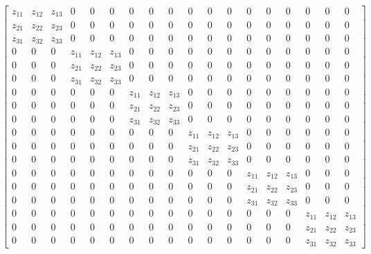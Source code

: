 \newpage
\begin{equation*}
\left[\begin{array}{cccccccccccccccccc}z_{11} & z_{12} & z_{13} & 0 & 0 & 0 & 0 & 0 & 0 & 0 & 0 & 0 & 0 & 0 & 0 & 0 & 0 & 0\\z_{21} & z_{22} & z_{23} & 0 & 0 & 0 & 0 & 0 & 0 & 0 & 0 & 0 & 0 & 0 & 0 & 0 & 0 & 0\\z_{31} & z_{32} & z_{33} & 0 & 0 & 0 & 0 & 0 & 0 & 0 & 0 & 0 & 0 & 0 & 0 & 0 & 0 & 0\\0 & 0 & 0 & z_{11} & z_{12} & z_{13} & 0 & 0 & 0 & 0 & 0 & 0 & 0 & 0 & 0 & 0 & 0 & 0\\0 & 0 & 0 & z_{21} & z_{22} & z_{23} & 0 & 0 & 0 & 0 & 0 & 0 & 0 & 0 & 0 & 0 & 0 & 0\\0 & 0 & 0 & z_{31} & z_{32} & z_{33} & 0 & 0 & 0 & 0 & 0 & 0 & 0 & 0 & 0 & 0 & 0 & 0\\0 & 0 & 0 & 0 & 0 & 0 & z_{11} & z_{12} & z_{13} & 0 & 0 & 0 & 0 & 0 & 0 & 0 & 0 & 0\\0 & 0 & 0 & 0 & 0 & 0 & z_{21} & z_{22} & z_{23} & 0 & 0 & 0 & 0 & 0 & 0 & 0 & 0 & 0\\0 & 0 & 0 & 0 & 0 & 0 & z_{31} & z_{32} & z_{33} & 0 & 0 & 0 & 0 & 0 & 0 & 0 & 0 & 0\\0 & 0 & 0 & 0 & 0 & 0 & 0 & 0 & 0 & z_{11} & z_{12} & z_{13} & 0 & 0 & 0 & 0 & 0 & 0\\0 & 0 & 0 & 0 & 0 & 0 & 0 & 0 & 0 & z_{21} & z_{22} & z_{23} & 0 & 0 & 0 & 0 & 0 & 0\\0 & 0 & 0 & 0 & 0 & 0 & 0 & 0 & 0 & z_{31} & z_{32} & z_{33} & 0 & 0 & 0 & 0 & 0 & 0\\0 & 0 & 0 & 0 & 0 & 0 & 0 & 0 & 0 & 0 & 0 & 0 & z_{11} & z_{12} & z_{13} & 0 & 0 & 0\\0 & 0 & 0 & 0 & 0 & 0 & 0 & 0 & 0 & 0 & 0 & 0 & z_{21} & z_{22} & z_{23} & 0 & 0 & 0\\0 & 0 & 0 & 0 & 0 & 0 & 0 & 0 & 0 & 0 & 0 & 0 & z_{31} & z_{32} & z_{33} & 0 & 0 & 0\\0 & 0 & 0 & 0 & 0 & 0 & 0 & 0 & 0 & 0 & 0 & 0 & 0 & 0 & 0 & z_{11} & z_{12} & z_{13}\\0 & 0 & 0 & 0 & 0 & 0 & 0 & 0 & 0 & 0 & 0 & 0 & 0 & 0 & 0 & z_{21} & z_{22} & z_{23}\\0 & 0 & 0 & 0 & 0 & 0 & 0 & 0 & 0 & 0 & 0 & 0 & 0 & 0 & 0 & z_{31} & z_{32} & z_{33}\end{array}\right]
\end{equation*}

